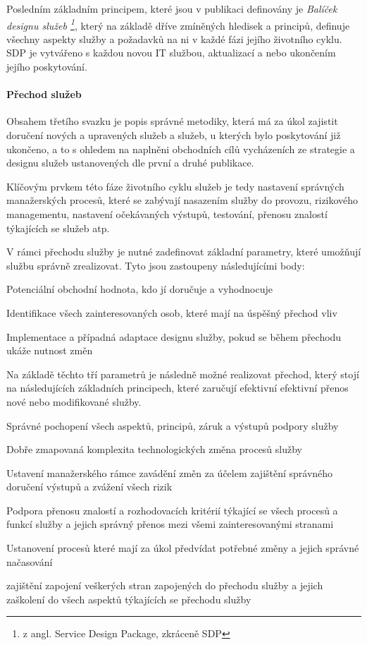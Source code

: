 \documentclass[
  digital,     %
  twoside,     %
  lof,         %
  lot,         %
]{fithesis4}
\begin{document}
Posledním základním principem, které jsou v publikaci definovány je  \emph{Balíček designu služeb \footnote{z angl. Service Design Package, zkráceně SDP}}, který na základě dříve zmíněných hledisek a principů, definuje všechny aspekty služby a požadavků na ni v každé fázi jejího životního cyklu. SDP je vytvářeno s každou novou IT službou, aktualizací a nebo ukončením jejího poskytování.\parencite[s.~23]{Carlidge2007}
\paragraph{Přechod služeb}
Obsahem třetího svazku je popis správné metodiky, která má za úkol zajistit doručení nových a upravených služeb a služeb, u kterých bylo poskytování již ukončeno, a to s ohledem na naplněni obchodních cílů vycházeních ze strategie a designu služeb ustanovených dle první a druhé publikace.\parencite[s.~30]{Carlidge2007}

Klíčovým prvkem této fáze životního cyklu služeb je tedy nastavení správných manažerských procesů, které se zabývají nasazením služby do provozu, rizikového managementu, nastavení očekávaných výstupů, testování, přenosu znalostí týkajících se služeb atp.\parencite[s.~30]{Carlidge2007}

V rámci přechodu služby je nutné zadefinovat základní parametry, které umožňují službu správně zrealizovat. Tyto jsou zastoupeny následujícími body:\parencite[s.~30]{Carlidge2007}
\begin{compactitem}
    \item Potenciální obchodní hodnota, kdo jí doručuje a vyhodnocuje
    \item Identifikace všech zainteresovaných osob, které mají na úspěšný přechod vliv
    \item Implementace a případná adaptace designu služby, pokud se během přechodu ukáže nutnost změn
\end{compactitem}

Na základě těchto tří parametrů je následně možné realizovat přechod, který stojí na následujících základních principech, které zaručují efektivní efektivní přenos nové nebo modifikované služby. \parencite[s.~30]{Carlidge2007}
\begin{compactitem}
    \item Správné pochopení všech aspektů, principů, záruk a výstupů podpory služby
    \item Dobře zmapovaná komplexita technologických změna  procesů služby
    \item Ustavení manažerského rámce zavádění změn za účelem zajištění správného doručení výstupů a zvážení všech rizik
    \item Podpora přenosu znalostí a rozhodovacích kritérií týkající se všech procesů a funkcí služby a jejich správný přenos mezi všemi zainteresovanými stranami
    \item Ustanovení procesů které mají za úkol předvídat potřebné změny a jejich správné načasování
    \item zajištění zapojení veškerých stran zapojených do přechodu služby a jejich zaškolení do všech aspektů týkajících se přechodu služby
\end{compactitem}
\end{document}
